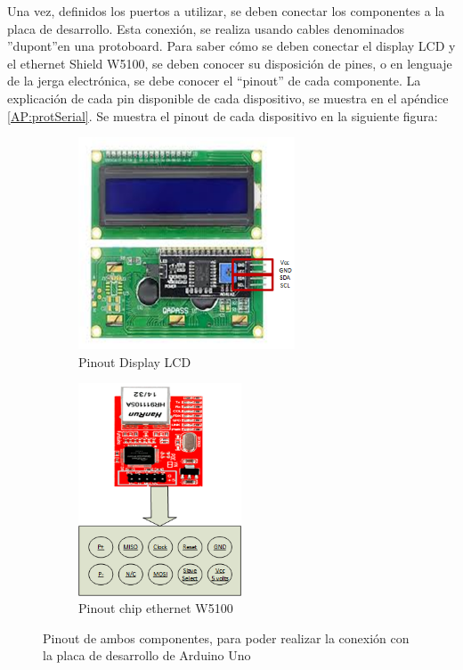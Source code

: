 Una vez, definidos los puertos a utilizar, se deben conectar los componentes a la placa de desarrollo. Esta conexión, se realiza usando cables denominados ''dupont''en una protoboard. 
Para saber cómo se deben conectar el display LCD y el ethernet Shield W5100, se deben conocer su disposición de pines, o en lenguaje de la jerga electrónica, se debe conocer el ``pinout'' de cada componente. La explicación de cada pin disponible de cada dispositivo, se muestra en el apéndice \ref{AP:protSerial}. Se muestra el pinout  de cada dispositivo en la siguiente figura: %

\setlength{\textwidth}{190mm}

\begin{figure}[ht]
	\begin{subfigure}{0.5\textwidth}
		\centering	
		\includegraphics[height=6.3cm]{pinout LCD}
		\caption{Pinout Display LCD }		
	\end{subfigure}
	\hspace{-30mm}
	\begin{subfigure}{0.5\textwidth}		
		\centering
		 
		\includegraphics[height=6.3cm]{pinoutW5100}
		\caption{Pinout chip ethernet W5100}	
	\end{subfigure}
	
	\caption{Pinout de ambos componentes, para poder realizar la conexión con la placa de desarrollo de Arduino Uno}
	\label{fig:pinoutlcdeth}
\end{figure}
\setlength{\textwidth}{150mm}

